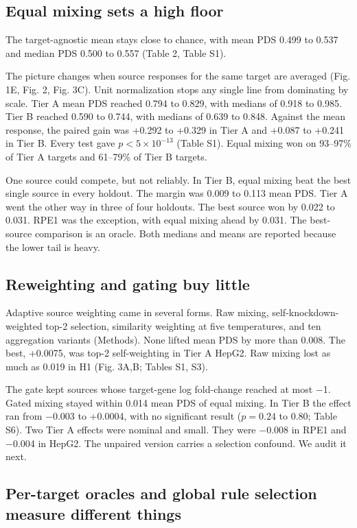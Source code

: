 \documentclass[12pt]{article}
\begin{document}
\subsection{Equal mixing sets a high floor}

The target-agnostic mean stays close to chance, with mean PDS 0.499 to 0.537 and median PDS 0.500 to 0.557 (Table 2, Table S1).

The picture changes when source responses for the same target are averaged (Fig. 1E, Fig. 2, Fig. 3C). Unit normalization stops any single line from dominating by scale. Tier A mean PDS reached 0.794 to 0.829, with medians of 0.918 to 0.985. Tier B reached 0.590 to 0.744, with medians of 0.639 to 0.848. Against the mean response, the paired gain was +0.292 to +0.329 in Tier A and +0.087 to +0.241 in Tier B. Every test gave $p < 5 \times 10^{-13}$ (Table S1). Equal mixing won on 93–97\% of Tier A targets and 61–79\% of Tier B targets.

One source could compete, but not reliably. In Tier B, equal mixing beat the best single source in every holdout. The margin was 0.009 to 0.113 mean PDS. Tier A went the other way in three of four holdouts. The best source won by 0.022 to 0.031. RPE1 was the exception, with equal mixing ahead by 0.031. The best-source comparison is an oracle. Both medians and means are reported because the lower tail is heavy.

\subsection{Reweighting and gating buy little}

Adaptive source weighting came in several forms. Raw mixing, self-knockdown-weighted top-2 selection, similarity weighting at five temperatures, and ten aggregation variants (Methods). None lifted mean PDS by more than 0.008. The best, +0.0075, was top-2 self-weighting in Tier A HepG2. Raw mixing lost as much as 0.019 in H1 (Fig. 3A,B; Tables S1, S3).

The gate kept sources whose target-gene log fold-change reached at most $-$1. Gated mixing stayed within 0.014 mean PDS of equal mixing. In Tier B the effect ran from $-$0.003 to +0.0004, with no significant result ($p = 0.24$ to 0.80; Table S6). Two Tier A effects were nominal and small. They were $-$0.008 in RPE1 and $-$0.004 in HepG2. The unpaired version carries a selection confound. We audit it next.

\subsection{Per-target oracles and global rule selection measure different things}
\end{document}
